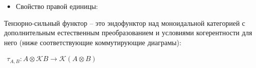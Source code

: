 \begin{defin}
\begin{itemize}

    \item Свойство правой единицы:

  \end{itemize}
\end{defin}

\begin{defin}

Тензорно-сильный функтор -- это эндофунктор над моноидальной категорией с дополнительным естественным преобразованием и условиями когерентности для него (ниже соответствующие коммутирующие диаграмы):

\begin{center}
$\begin{array}{lll}
  \tau_{A, B} : A \otimes \mathcal{K}B \rightarrow \mathcal{K}(A \otimes B)
\end{array}$
\end{center}


\end{defin}

